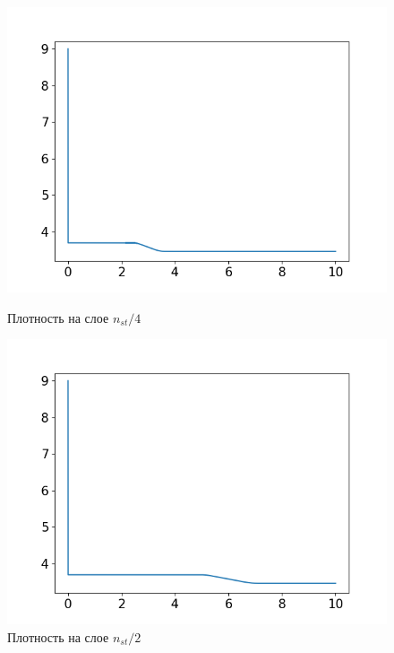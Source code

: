 \begin{figure}[h]
	\begin{minipage}[h]{0.47\linewidth}
		\centering
		\includegraphics[width=1\linewidth]{pics/task4/14h_2.png} 
		\caption{Плотность на слое $n_{st} / 4$}
	\end{minipage}
	\hfill
	\begin{minipage}[h]{0.47\linewidth}
		\centering
		\includegraphics[width=1\linewidth]{pics/task4/24h_2.png} 
		\caption{Плотность на слое $n_{st} / 2$}
	\end{minipage}
	\vfill
	\begin{minipage}[h]{0.47\linewidth}
		\centering

\end{minipage}
\end{figure}
